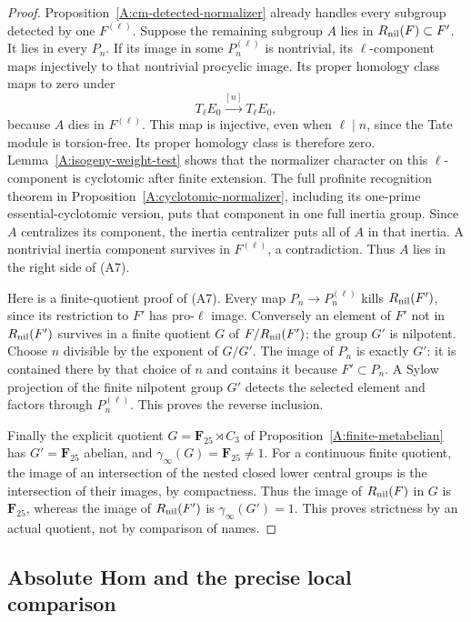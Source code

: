 \begin{proof}
Proposition~\ref{A:cm-detected-normalizer} already
handles every subgroup detected by one $F^{(\ell)}$.
Suppose the remaining subgroup $A$ lies in
$R_{\rm nil}(F)\subset F'$.  It lies in every $P_n$.
If its image in some $P_n^{(\ell)}$ is nontrivial,
its $\ell$-component maps injectively to that
nontrivial procyclic image.  Its proper homology class
maps to zero under
\[
 T_\ell E_0\xrightarrow{[n]}T_\ell E_0,
\]
because $A$ dies in $F^{(\ell)}$.  This map is
injective, even when $\ell\mid n$, since the Tate
module is torsion-free.  Its proper homology class
is therefore zero.  Lemma~\ref{A:isogeny-weight-test}
shows that the normalizer character on this
$\ell$-component is cyclotomic after finite extension.
The full profinite recognition theorem in
Proposition~\ref{A:cyclotomic-normalizer}, including
its one-prime essential-cyclotomic version, puts that
component in one full inertia group.  Since $A$
centralizes its component, the inertia centralizer
puts all of $A$ in that inertia.  A nontrivial
inertia component survives in $F^{(\ell)}$, a
contradiction.  Thus $A$ lies in the right side of
(A7).

Here is a finite-quotient proof of (A7).  Every
map $P_n\to P_n^{(\ell)}$ kills
$R_{\rm nil}(F')$, since its restriction to $F'$
has pro-$\ell$ image.  Conversely an element of
$F'$ not in $R_{\rm nil}(F')$ survives in a finite
quotient $G$ of $F/R_{\rm nil}(F')$; the group
$G'$ is nilpotent.  Choose $n$ divisible by the
exponent of $G/G'$.  The image of $P_n$ is exactly
$G'$: it is contained there by that choice of $n$
and contains it because $F'\subset P_n$.
A Sylow projection of the finite nilpotent group
$G'$ detects the selected element and factors
through $P_n^{(\ell)}$.  This proves the reverse
inclusion.

Finally the explicit quotient
$G=\mathbf F_{25}\rtimes C_3$ of
Proposition~\ref{A:finite-metabelian} has
$G'=\mathbf F_{25}$ abelian, and
$\gamma_\infty(G)=\mathbf F_{25}\ne1$.
For a continuous finite quotient, the image of an
intersection of the nested closed lower central
groups is the intersection of their images, by
compactness.  Thus the image of
$R_{\rm nil}(F)$ in $G$ is $\mathbf F_{25}$,
whereas the image of $R_{\rm nil}(F')$ is
$\gamma_\infty(G')=1$.  This proves strictness by
an actual quotient, not by comparison of names.
\end{proof}

\subsection{Absolute Hom and the precise local comparison}

